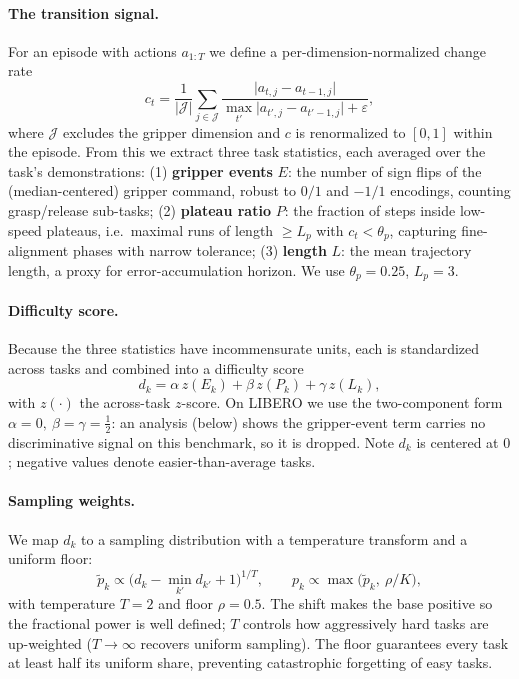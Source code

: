 \documentclass[letterpaper]{article} %
\newcommand{\dk}{d_{k}}
\newcommand{\pk}{p_{k}}
\begin{document}
\paragraph{The transition signal.}
For an episode with actions $a_{1:T}$ we define a per-dimension-normalized change rate
\begin{equation}
c_t=\frac{1}{|\mathcal{J}|}\sum_{j\in\mathcal{J}}\frac{\lvert a_{t,j}-a_{t-1,j}\rvert}{\max_{t'}\lvert a_{t',j}-a_{t'-1,j}\rvert+\varepsilon},
\label{eq:changerate}
\end{equation}
where $\mathcal{J}$ excludes the gripper dimension and $c$ is renormalized to $[0,1]$ within the episode. From this we extract three task statistics, each averaged over the task's demonstrations:
(1) \textbf{gripper events} $E$: the number of sign flips of the (median-centered) gripper command, robust to $0/1$ and $-1/1$ encodings, counting grasp/release sub-tasks;
(2) \textbf{plateau ratio} $P$: the fraction of steps inside low-speed plateaus, i.e.\ maximal runs of length $\geq L_p$ with $c_t<\theta_p$, capturing fine-alignment phases with narrow tolerance;
(3) \textbf{length} $L$: the mean trajectory length, a proxy for error-accumulation horizon. We use $\theta_p{=}0.25$, $L_p{=}3$.

\paragraph{Difficulty score.}
Because the three statistics have incommensurate units, each is standardized across tasks and combined into a difficulty score
\begin{equation}
\dk=\alpha\, z(E_k)+\beta\, z(P_k)+\gamma\, z(L_k),
\label{eq:dk}
\end{equation}
with $z(\cdot)$ the across-task $z$-score. On LIBERO we use the two-component form $\alpha{=}0,\ \beta{=}\gamma{=}\tfrac12$: an analysis (below) shows the gripper-event term carries no discriminative signal on this benchmark, so it is dropped. Note $\dk$ is centered at $0$; negative values denote easier-than-average tasks.

\paragraph{Sampling weights.}
We map $\dk$ to a sampling distribution with a temperature transform and a uniform floor:
\begin{equation}
\tilde{p}_k\propto\big(\dk-\textstyle\min_{k'}d_{k'}+1\big)^{1/T},\qquad
\pk\propto\max\!\big(\tilde{p}_k,\ \rho/K\big),
\label{eq:pk}
\end{equation}
with temperature $T{=}2$ and floor $\rho{=}0.5$. The shift makes the base positive so the fractional power is well defined; $T$ controls how aggressively hard tasks are up-weighted ($T\!\to\!\infty$ recovers uniform sampling). The floor guarantees every task at least half its uniform share, preventing catastrophic forgetting of easy tasks.
\end{document}
